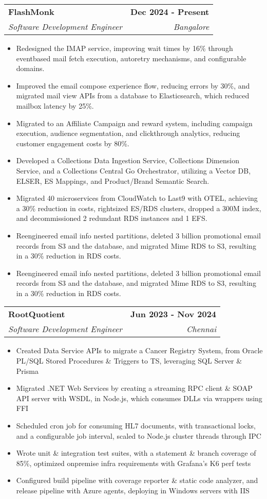\documentclass[letterpaper,11pt]{article}
\makeatletter
\newcommand{\resumeItem}[1]{
  \item\small{
    {#1 \vspace{-2pt}}
  }
}
\newcommand{\resumeSubheading}[4]{
  \vspace{-2pt}\item
    \begin{tabular*}{1.0\textwidth}[t]{l@{\extracolsep{\fill}}r}
      \textbf{#1} & \textbf{\small #2} \\
      \textit{\small#3} & \textit{\small #4} \\
    \end{tabular*}\vspace{-7pt}
}
\newcommand{\resumeItemListStart}{\begin{itemize}}
\newcommand{\resumeItemListEnd}{\end{itemize}\vspace{-5pt}}
\makeatother
\begin{document}
    \resumeSubheading
      {FlashMonk}{Dec 2024 - Present}
      {Software Development Engineer}{Bangalore}
      \resumeItemListStart
        \resumeItem{Redesigned the IMAP service, improving wait times by 16\% through event\textendash based mail fetch execution, auto\textendash retry mechanisms, and configurable domains.}
        \resumeItem{Improved the email compose experience flow, reducing errors by 30\%, and migrated mail view APIs from a database to Elasticsearch, which reduced mailbox latency by 25\%.}
        \resumeItem{Migrated to an Affiliate Campaign and reward system, including campaign execution, audience segmentation, and click\textendash through analytics, reducing customer engagement costs by 80\%.}
        \resumeItem{Developed a Collections Data Ingestion Service, Collections Dimension Service, and a Collections Central Go Orchestrator, utilizing a Vector DB, ELSER, ES Mappings, and Product/Brand Semantic Search.}
        \resumeItem{Migrated 40 microservices from CloudWatch to Last9 with OTEL, achieving a 30\% reduction in costs, right\textendash sized ES/RDS clusters, dropped a 300M index, and decommissioned 2 redundant RDS instances and 1 EFS.}
        \resumeItem{Re\textendash engineered email info nested partitions, deleted 3 billion promotional email records from S3 and the database, and migrated Mime RDS to S3, resulting in a 30\% reduction in RDS costs.}
        \resumeItem{Re\textendash engineered email info nested partitions, deleted 3 billion promotional email records from S3 and the database, and migrated Mime RDS to S3, resulting in a 30\% reduction in RDS costs.}
      \resumeItemListEnd

    \resumeSubheading
      {RootQuotient}{Jun 2023 - Nov 2024}
      {Software Development Engineer}{Chennai}
      \resumeItemListStart
        \resumeItem{Created Data Service APIs to migrate a Cancer Registry System, from Oracle PL/SQL Stored Procedures \& Triggers to TS, leveraging SQL Server \& Prisma}
        \resumeItem{Migrated .NET Web Services by creating a streaming RPC client \& SOAP API server with WSDL, in Node.js, which consumes DLLs via wrappers using FFI}
        \resumeItem{Scheduled cron job for consuming HL7 documents, with transactional locks, and a configurable job interval, scaled to Node.js cluster threads through IPC}
        \resumeItem{Wrote unit \& integration test suites, with a statement \& branch coverage of 85\%, optimized on\textendash premise infra requirements with Grafana's K6 perf tests}
        \resumeItem{Configured build pipeline with coverage reporter \& static code analyzer, and release pipeline with Azure agents, deploying in Windows servers with IIS}
      \resumeItemListEnd
\end{document}
